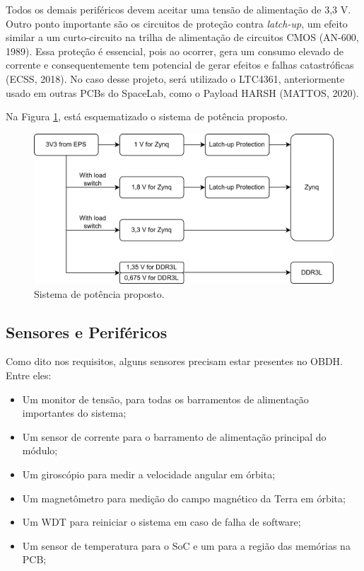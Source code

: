 Todos os demais periféricos devem aceitar uma tensão de alimentação de 3,3 V. Outro ponto importante são os circuitos de proteção contra \textit{latch-up}, um efeito similar a um curto-circuito na trilha de alimentação de circuitos CMOS (AN-600, 1989). Essa proteção é essencial, pois ao ocorrer, gera um consumo elevado de corrente e consequentemente tem potencial de gerar efeitos e falhas catastróficas (ECSS, 2018). No caso desse projeto, será utilizado o LTC4361, anteriormente usado em outras PCBs do SpaceLab, como o Payload HARSH (MATTOS, 2020). 

Na Figura \ref{fig:diapower}, está esquematizado o sistema de potência proposto.

\begin{figure}[H]
    \centering
    \includegraphics[scale=1]{images/diapower.png}
    \caption{Sistema de potência proposto.}
    \label{fig:diapower}
\end{figure}

\subsection{Sensores e Periféricos}
Como dito nos requisitos, alguns sensores precisam estar presentes no OBDH. Entre eles:

\begin{itemize}
	\item Um monitor de tensão, para todas os barramentos de alimentação importantes do sistema;
	\item Um sensor de corrente para o barramento de alimentação principal do módulo;
	\item Um giroscópio para medir a velocidade angular em órbita;
	\item Um magnetômetro para medição do campo magnético da Terra em órbita;
	\item Um WDT para reiniciar o sistema em caso de falha de software;
	\item Um sensor de temperatura para o SoC e um para a região das memórias na PCB;
\end{itemize}

